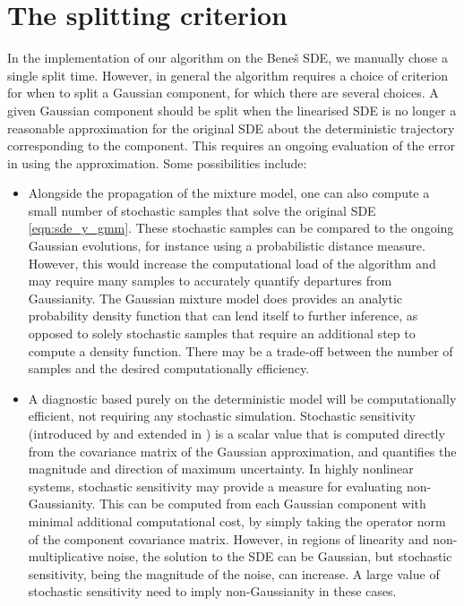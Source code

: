 \section{The splitting criterion}\label{sec:gmm_split_disc}
In the implementation of our algorithm on the Bene\v{s} SDE, we manually chose a single split time.
However, in general the algorithm requires a choice of criterion for when to split a Gaussian component, for which there are several choices.
A given Gaussian component should be split when the linearised SDE is no longer a reasonable approximation for the original SDE about the deterministic trajectory corresponding to the component.
This requires an ongoing evaluation of the error in using the approximation.
Some possibilities include:
\begin{itemize}
	\item Alongside the propagation of the mixture model, one can also compute a small number of stochastic samples that solve the original SDE \cref{eqn:sde_y_gmm}.
	      These stochastic samples can be compared to the ongoing Gaussian evolutions, for instance using a probabilistic distance measure.
	      However, this would increase the computational load of the algorithm and may require many samples to accurately quantify departures from Gaussianity.
	      The Gaussian mixture model does provides an analytic probability density function that can lend itself to further inference, as opposed to solely stochastic samples that require an additional step to compute a density function.
	      There may be a trade-off between the number of samples and the desired computationally efficiency.

	\item A diagnostic based purely on the deterministic model will be computationally efficient, not requiring any stochastic simulation.
	      Stochastic sensitivity (introduced by \citet{Balasuriya_2020_StochasticSensitivityComputable} and extended in ) is a scalar value that is computed directly from the covariance matrix of the Gaussian approximation, and quantifies the magnitude and direction of maximum uncertainty.
	      In highly nonlinear systems, stochastic sensitivity may provide a measure for evaluating non-Gaussianity.
	      This can be computed from each Gaussian component with minimal additional computational cost, by simply taking the operator norm of the component covariance matrix.
	      However, in regions of linearity and non-multiplicative noise, the solution to the SDE can be Gaussian, but stochastic sensitivity, being the magnitude of the noise, can increase.
	      A large value of stochastic sensitivity need to imply non-Gaussianity in these cases.



\end{itemize}
